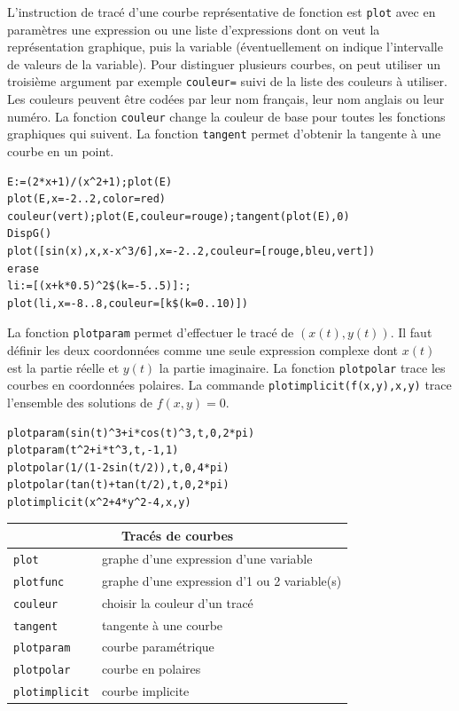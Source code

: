 \documentclass{article}
\begin{document}
L'instruction de trac\'e d'une courbe repr\'esentative de fonction est \verb|plot| avec en
param\`etres une expression ou une liste d'expressions dont on
veut la repr\'esentation graphique, puis la variable (\'eventuellement
on indique l'intervalle de valeurs de la variable). 
Pour distinguer plusieurs courbes,
on peut utiliser un troisi\`eme argument par exemple
\verb|couleur=| suivi de la liste des couleurs \`a utiliser. Les
couleurs peuvent \^etre cod\'ees par leur nom fran\c{c}ais, leur nom
anglais ou leur num\'ero. La fonction \verb|couleur| change la couleur
de base pour toutes les fonctions graphiques qui suivent.
La fonction \verb|tangent| permet d'obtenir la tangente \`a une courbe en un 
point.
\begin{verbatim}
E:=(2*x+1)/(x^2+1);plot(E)
plot(E,x=-2..2,color=red)
couleur(vert);plot(E,couleur=rouge);tangent(plot(E),0)
DispG()
plot([sin(x),x,x-x^3/6],x=-2..2,couleur=[rouge,bleu,vert])
erase
li:=[(x+k*0.5)^2$(k=-5..5)]:;
plot(li,x=-8..8,couleur=[k$(k=0..10)])
\end{verbatim}

La fonction \verb|plotparam| permet d'effectuer le
trac\'e de $(x(t),y(t))$. Il faut d\'efinir les deux coordonn\'ees 
comme une seule expression complexe dont $x(t)$ est la partie r\'eelle 
et $y(t)$ la partie imaginaire. La fonction \verb|plotpolar| 
trace les courbes en coordonn\'ees polaires. La commande
\verb|plotimplicit(f(x,y),x,y)| trace l'ensemble des solutions de
$f(x,y)=0$.
\begin{verbatim}
plotparam(sin(t)^3+i*cos(t)^3,t,0,2*pi)
plotparam(t^2+i*t^3,t,-1,1)
plotpolar(1/(1-2sin(t/2)),t,0,4*pi)
plotpolar(tan(t)+tan(t/2),t,0,2*pi)
plotimplicit(x^2+4*y^2-4,x,y)
\end{verbatim}

\begin{center}
\begin{tabular}{|ll|}
\hline
\multicolumn{2}{|c|}{\bf Trac\'es de courbes}\\
\hline\hline
\verb|plot| & graphe d'une expression d'une variable\\
\verb|plotfunc| & graphe d'une expression d'1 ou 2 variable(s)\\
\verb|couleur| & choisir la couleur d'un trac\'e\\
\verb|tangent| & tangente \`a une courbe\\
\verb|plotparam| & courbe param\'etrique\\
\verb|plotpolar| & courbe en polaires\\
\verb|plotimplicit| & courbe implicite\\
\hline
\end{tabular}
\end{center}
%
\end{document}
